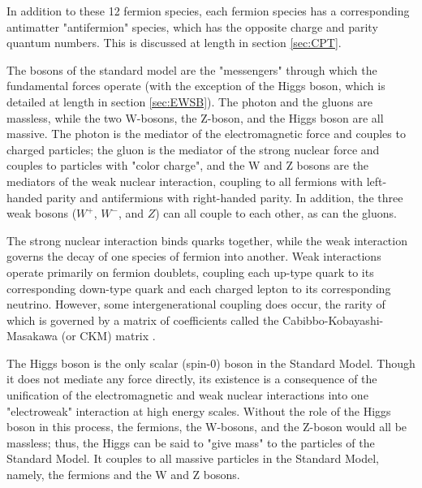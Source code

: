 In addition to these 12 fermion species, each fermion species has a corresponding antimatter "antifermion" species, which has the opposite charge and parity quantum numbers. This is discussed at length in section \ref{sec:CPT}.

The bosons of the standard model are the "messengers" through which the fundamental forces operate (with the exception of the Higgs boson, which is detailed at length in section \ref{sec:EWSB}). The photon and the gluons are massless, while the two W-bosons, the Z-boson, and the Higgs boson are all massive. The photon is the mediator of the electromagnetic force and couples to charged particles; the gluon is the mediator of the strong nuclear force and couples to particles with "color charge", and the W and Z bosons are the mediators of the weak nuclear interaction, coupling to all fermions with left-handed parity and antifermions with right-handed parity. In addition, the three weak bosons ($W^{+}$, $W^{-}$, and $Z$) can all couple to each other, as can the gluons.

The strong nuclear interaction binds quarks together, while the weak interaction governs the decay of one species of fermion into another. Weak interactions operate primarily on fermion doublets, coupling each up-type quark to its corresponding down-type quark and each charged lepton to its corresponding neutrino. However, some intergenerational coupling does occur, the rarity of which is governed by a matrix of coefficients called the Cabibbo-Kobayashi-Masakawa (or CKM) matrix \cite{CKM}. 

The Higgs boson is the only scalar (spin-0) boson in the Standard Model. Though it does not mediate any force directly, its existence is a consequence of the unification of the electromagnetic and weak nuclear interactions into one "electroweak" interaction at high energy scales. Without the role of the Higgs boson in this process, the fermions, the W-bosons, and the Z-boson would all be massless; thus, the Higgs can be said to "give mass" to the particles of the Standard Model. It couples to all massive particles in the Standard Model, namely, the fermions and the W and Z bosons.

